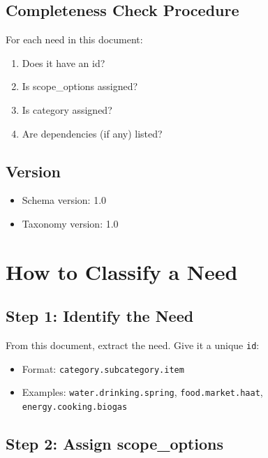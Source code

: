\documentclass[11pt,a4paper]{article}
\begin{document}
\subsection{Completeness Check Procedure}

For each need in this document:
\begin{enumerate}
    \item Does it have an id?
    \item Is scope\_options assigned?
    \item Is category assigned?
    \item Are dependencies (if any) listed?
\end{enumerate}

\subsection{Version}

\begin{itemize}
    \item Schema version: 1.0
    \item Taxonomy version: 1.0
\end{itemize}

\section{How to Classify a Need}

\subsection{Step 1: Identify the Need}

From this document, extract the need. Give it a unique \texttt{id}:

\begin{itemize}
    \item Format: \texttt{category.subcategory.item}
    \item Examples: \texttt{water.drinking.spring}, \texttt{food.market.haat}, \texttt{energy.cooking.biogas}
\end{itemize}

\subsection{Step 2: Assign scope\_options}
\end{document}
